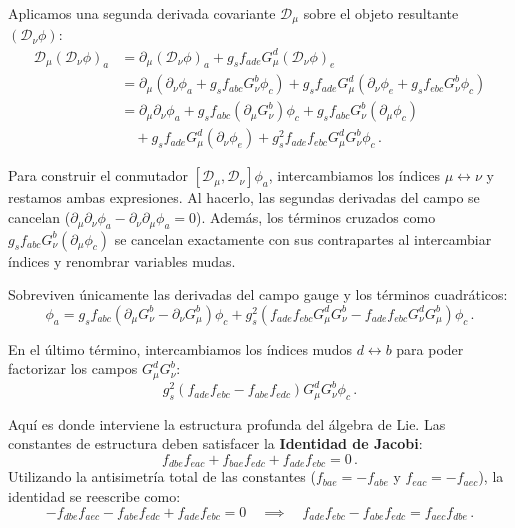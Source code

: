 Aplicamos una segunda derivada covariante $\mathcal{D}_\mu$ sobre el objeto resultante $(\mathcal{D}_\nu \phi)$:
\begin{align}
    \mathcal{D}_\mu (\mathcal{D}_\nu \phi)_a &= \partial_\mu (\mathcal{D}_\nu \phi)_a + g_s f_{ade} G_\mu^d (\mathcal{D}_\nu \phi)_e \nonumber \\
    &= \partial_\mu \left( \partial_\nu \phi_a + g_s f_{abc} G_\nu^b \phi_c \right) + g_s f_{ade} G_\mu^d \left( \partial_\nu \phi_e + g_s f_{ebc} G_\nu^b \phi_c \right) \nonumber \\
    &= \partial_\mu \partial_\nu \phi_a + g_s f_{abc} (\partial_\mu G_\nu^b) \phi_c + g_s f_{abc} G_\nu^b (\partial_\mu \phi_c) \nonumber \\
    &\quad + g_s f_{ade} G_\mu^d (\partial_\nu \phi_e) + g_s^2 f_{ade} f_{ebc} G_\mu^d G_\nu^b \phi_c \, .
\end{align}

Para construir el conmutador $[\mathcal{D}_\mu, \mathcal{D}_\nu] \phi_a$, intercambiamos los índices $\mu \leftrightarrow \nu$ y restamos ambas expresiones. 
Al hacerlo, las segundas derivadas del campo se cancelan ($\partial_\mu \partial_\nu \phi_a - \partial_\nu \partial_\mu \phi_a = 0$). Además, los términos cruzados como $g_s f_{abc} G_\nu^b (\partial_\mu \phi_c)$ se cancelan exactamente con sus contrapartes al intercambiar índices y renombrar variables mudas. 

Sobreviven únicamente las derivadas del campo gauge y los términos cuadráticos:
\begin{equation}
    [\mathcal{D}_\mu, \mathcal{D}_\nu] \phi_a = g_s f_{abc} (\partial_\mu G_\nu^b - \partial_\nu G_\mu^b) \phi_c + g_s^2 \left( f_{ade} f_{ebc} G_\mu^d G_\nu^b - f_{ade} f_{ebc} G_\nu^d G_\mu^b \right) \phi_c \, .
\end{equation}

En el último término, intercambiamos los índices mudos $d \leftrightarrow b$ para poder factorizar los campos $G_\mu^d G_\nu^b$:
\begin{equation}
    g_s^2 \left( f_{ade} f_{ebc} - f_{abe} f_{edc} \right) G_\mu^d G_\nu^b \phi_c \, .
    \label{eq:conmutador_f_f}
\end{equation}

Aquí es donde interviene la estructura profunda del álgebra de Lie. Las constantes de estructura deben satisfacer la \textbf{Identidad de Jacobi}:
\begin{equation}
    f_{dbe} f_{eac} + f_{bae} f_{edc} + f_{ade} f_{ebc} = 0 \, .
\end{equation}
Utilizando la antisimetría total de las constantes ($f_{bae} = -f_{abe}$ y $f_{eac} = -f_{aec}$), la identidad se reescribe como:
\begin{equation}
    -f_{dbe} f_{aec} - f_{abe} f_{edc} + f_{ade} f_{ebc} = 0 \quad \implies \quad f_{ade} f_{ebc} - f_{abe} f_{edc} = f_{aec} f_{dbe} \, .
\end{equation}

